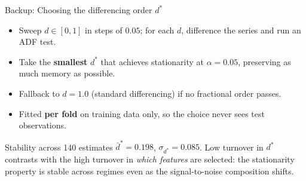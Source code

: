 \documentclass[aspectratio=169, t]{beamer}
\begin{document}
\begin{frame}{Backup: Choosing the differencing order $d^\ast$}
\vspace{-0.4em}

\begin{itemize}\footnotesize\setlength{\itemsep}{4pt}
  \item Sweep $d \in [0, 1]$ in steps of $0.05$; for each $d$, difference the series and run an ADF test.
  \item Take the \textbf{smallest} $d^\ast$ that achieves stationarity at $\alpha = 0.05$, preserving as much memory as possible.
  \item Fallback to $d = 1.0$ (standard differencing) if no fractional order passes.
  \item Fitted \textbf{per fold} on training data only, so the choice never sees test observations.
\end{itemize}

\vspace{0.6em}

{
\begin{block}{Stability across 140 estimates}
\footnotesize
$\bar{d}^\ast = 0.198$, $\sigma_{d^\ast} = 0.085$. Low turnover in $d^\ast$ contrasts with the high turnover in \emph{which features} are selected: the stationarity property is stable across regimes even as the signal-to-noise composition shifts.
\end{block}
}
\end{frame}
\end{document}
